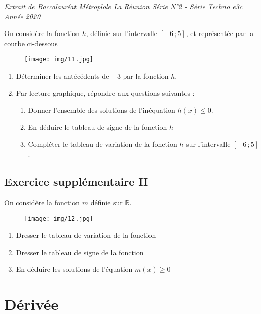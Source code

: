 \documentclass[a4paper,12pt]{article}
\begin{document}
\textit{Extrait de Baccalauréat Métroplole La Réunion Série N°2 - Série Techno e3c Année 2020}

\vspace{1em}

On considère la fonction $h$, définie sur l'intervalle $[-6\,; 5]$, et représentée par la courbe ci-dessous

\begin{figure}[H]
  \centering
  \texttt{[image: img/11.jpg]}
\end{figure}

\begin{enumerate}[noitemsep]
  \item Déterminer les antécédents de $-3$ par la fonction $h$.
  \item Par lecture graphique, répondre aux questions suivantes :
  \begin{enumerate}[noitemsep]
      \item Donner l'ensemble des solutions de l'inéquation $h(x) \leq 0$.
      \item En déduire le tableau de signe de la fonction $h$
      \item Compléter le tableau de variation de la fonction $h$ sur l'intervalle $[-6\,; 5]$.
  \end{enumerate}
\end{enumerate}

\subsection*{Exercice supplémentaire II}

On considère la fonction $m$ définie sur $\mathbb{R}$.

\begin{figure}[H]
  \centering
  \texttt{[image: img/12.jpg]}
\end{figure}

\begin{enumerate}[noitemsep]
  \item Dresser le tableau de variation de la fonction 
  \item Dresser le tableau de signe de la fonction 
  \item En déduire les solutions de l'équation $m(x) \geq 0$
\end{enumerate}

\section*{Dérivée}
\end{document}
